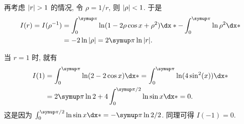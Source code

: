 \begin{exercise}[series=exer]
\begin{answer}
    再考虑 $ \abs{r} > 1 $ 的情况, 令 $ \rho = 1/r $, 则 $ \abs{\rho} < 1 $. 于是
    \begin{align*}
      I(r) = I(\rho^{-1}) & = \int_{0}^{\pi} \ln(1 - 2\rho \cos x + \rho^{2}) \dx* - \int_{0}^{\pi} \ln \rho^{2} \dx* \\
      & =  -2 \ln \abs{\rho} = 2\pi \ln \abs{r}.
    \end{align*}

    当 $ r = 1 $ 时, 就有
    \begin{align*}
      I(1) & = \int_{0}^{\pi} \ln(2 - 2\cos x) \dx* = \int_{0}^{\pi}  \ln(4\sin^{2}(x)) \dx* \\
      & = 2\pi \ln 2 + 4\int_{0}^{\pi/2} \ln \sin x \dx* = 0.
    \end{align*}
    这是因为 $ \int_{0}^{\pi/2} \ln \sin x \dx* = -\pi\ln 2/2 $. 同理可得 $ I(-1) = 0 $.


\end{answer}
\end{exercise}

